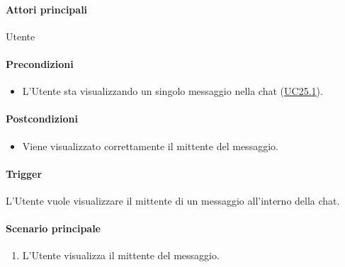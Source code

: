 \paragraph*{Attori principali}
Utente

\paragraph*{Precondizioni}
\begin{itemize}
  \item L'Utente sta visualizzando un singolo messaggio nella chat (\hyperref[UC25point1]{UC25.1}).
\end{itemize}

\paragraph*{Postcondizioni}
\begin{itemize}
  \item Viene visualizzato correttamente il mittente del messaggio.
\end{itemize}

\paragraph*{Trigger}
L'Utente vuole visualizzare il mittente di un messaggio all'interno della chat.

\paragraph*{Scenario principale}
\begin{enumerate}
  \item L'Utente visualizza il mittente del messaggio.
\end{enumerate}